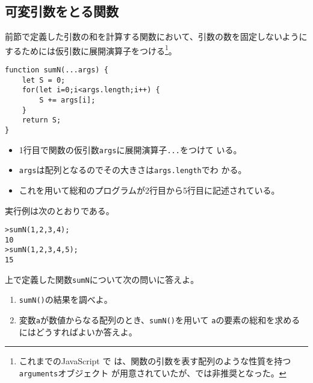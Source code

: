 \subsection{可変引数をとる関数}
前節で定義した引数の和を計算する関数において、引数の数を固定しないように
するためには仮引数に展開演算子をつける\footnote{これまでのJavaScript で
は、関数の引数を表す配列のような性質を持つ\texttt{arguments}オブジェクト
が用意されていたが、\ES では非推奨となった。}。
\begin{Verbatim}
function sumN(...args) {
    let S = 0;
    for(let i=0;i<args.length;i++) {
        S += args[i];
    }
    return S;
}
\end{Verbatim}
\begin{itemize}
 \item 1行目で関数の仮引数\texttt{args}に展開演算子\texttt{...}をつけて
       いる。
 \item \texttt{args}は配列となるのでその大きさは\texttt{args.length}でわ
       かる。
 \item これを用いて総和のプログラムが2行目から5行目に記述されている。
\end{itemize}
実行例は次のとおりである。
\begin{Verbatim}
>sumN(1,2,3,4);
10
>sumN(1,2,3,4,5);
15
\end{Verbatim}
 \begin{Prob}\upshape
  上で定義した関数\texttt{sumN}について次の問いに答えよ。
  \begin{enumerate}
   \item \texttt{sumN()}の結果を調べよ。
   \item 変数\texttt{a}が数値からなる配列のとき、\texttt{sumN()}を用いて
         \texttt{a}の要素の総和を求めるにはどうすればよいか答えよ。
  \end{enumerate}
\end{Prob}
\fi
